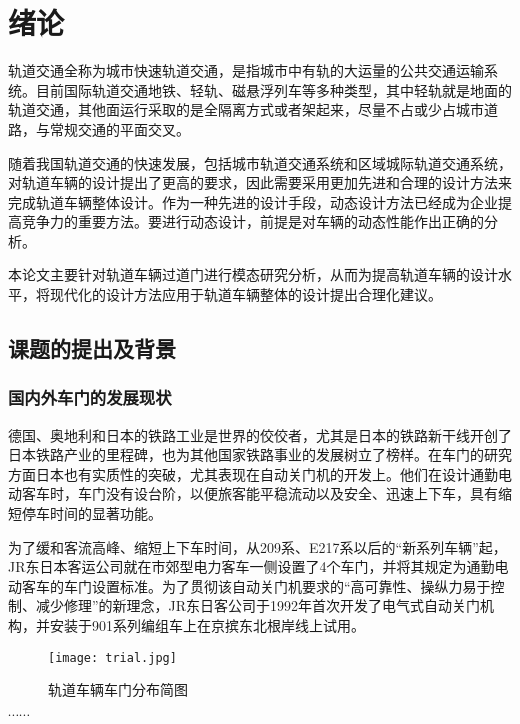 \section{绪论}
轨道交通全称为城市快速轨道交通，是指城市中有轨的大运量的公共交通运输系统。目前国际轨道交通地铁、轻轨、磁悬浮列车等多种类型，其中轻轨就是地面的轨道交通，其他面运行采取的是全隔离方式或者架起来，尽量不占或少占城市道路，与常规交通的平面交叉\cite{HuGuoLiang2009ANSYS}。

随着我国轨道交通的快速发展，包括城市轨道交通系统和区域城际轨道交通系统，对轨道车辆的设计提出了更高的要求，因此需要采用更加先进和合理的设计方法来完成轨道车辆整体设计。作为一种先进的设计手段，动态设计方法已经成为企业提高竞争力的重要方法。要进行动态设计，前提是对车辆的动态性能作出正确的分析\citet{ZhuQingJun2010Analysis}。

本论文主要针对轨道车辆过道门进行模态研究分析，从而为提高轨道车辆的设计水平，将现代化的设计方法应用于轨道车辆整体的设计提出合理化建议。
\subsection{课题的提出及背景}
\subsubsection{国内外车门的发展现状}
德国、奥地利和日本的铁路工业是世界的佼佼者，尤其是日本的铁路新干线开创了日本铁路产业的里程碑，也为其他国家铁路事业的发展树立了榜样。在车门的研究方面日本也有实质性的突破，尤其表现在自动关门机的开发上。他们在设计通勤电动客车时，车门没有设台阶，以便旅客能平稳流动以及安全、迅速上下车，具有缩短停车时间的显著功能\citep{ChengHeng2010Applications}。

为了缓和客流高峰、缩短上下车时间，从209系、E217系以后的“新系列车辆”起，JR东日本客运公司就在市郊型电力客车一侧设置了4个车门，并将其规定为通勤电动客车的车门设置标准。为了贯彻该自动关门机要求的“高可靠性、操纵力易于控制、减少修理”的新理念，JR东日客公司于1992年首次开发了电气式自动关门机构，并安装于901系列编组车上在京摈东北根岸线上试用。

\begin{figure}
    \centering
    \texttt{[image: trial.jpg]}
    \caption{轨道车辆车门分布简图}
    \label{fig:trial}
\end{figure}

$\cdots\cdots$
